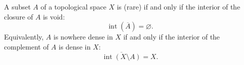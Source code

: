 A subset $A$ of a topological space $X$ is  (rare) if and only if the interior of the closure of $A$ is void:
\[
\operatorname{int}(\overline{A}) = \varnothing.
\]
Equivalently, $A$ is nowhere dense in $X$ if and only if the interior of the complement of $A$ is dense in $X$:
\[
\overline{\operatorname{int}(X \setminus A)} = X.
\]
